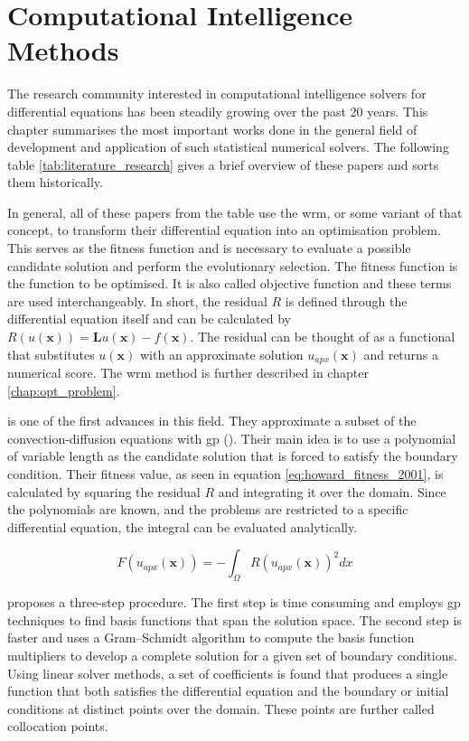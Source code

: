 \documentclass[./\jobname.tex]{subfiles}
\begin{document}
\section{Computational Intelligence Methods} 
\label{chap:literature_overview}

The research community interested in computational intelligence solvers for differential equations has been steadily growing over the past 20 years. This chapter summarises the most important works done in the general field of development and application of such statistical numerical solvers. The following table \ref{tab:literature_research} gives a brief overview of these papers and sorts them historically. 

In general, all of these papers from the table use the \gls{wrm}, or some variant of that concept, to transform their differential equation into an optimisation problem. This serves as the fitness function and is necessary to evaluate a possible candidate solution and perform the evolutionary selection. The fitness function is the function to be optimised. It is also called objective function and these terms are used interchangeably. In short, the residual $R$ is defined through the differential equation itself and can be calculated by $R(u(\mathbf{x})) = \mathbf{L}u(\mathbf{x}) - f(\mathbf{x})$. The residual can be thought of as a functional that substitutes $u(\mathbf{x})$ with an approximate solution $u_{apx}(\mathbf{x})$ and returns a numerical score. The \gls{wrm} method is further described in chapter \ref{chap:opt_problem}.

\cite{howard_genetic_2001} is one of the first advances in this field. They approximate a subset of the convection-diffusion equations with \gls{gp} (\cite{koza_genetic_1992}). Their main idea is to use a polynomial of variable length as the candidate solution that is forced to satisfy the boundary condition. Their fitness value, as seen in equation \eqref{eq:howard_fitness_2001}, is calculated by squaring the residual $R$ and integrating it over the domain. Since the polynomials are known, and the problems are restricted to a specific differential equation, the integral can be evaluated analytically. 

\begin{equation}
\label{eq:howard_fitness_2001}
	F(u_{apx}(\mathbf{x})) = -\int_{\Omega} R(u_{apx}(\mathbf{x}))^2 dx
\end{equation}

\cite{kirstukas_hybrid_2005} proposes a three-step procedure. The first step is time consuming and employs \gls{gp} techniques to find basis functions that span the solution space. The second step is faster and uses a Gram–Schmidt algorithm to compute the basis function multipliers to develop a complete solution for a given set of boundary conditions. Using linear solver methods, a set of coefficients is found that produces a single function that both satisfies the differential equation and the boundary or initial conditions at distinct points over the domain. These points are further called collocation points. 
\end{document}
